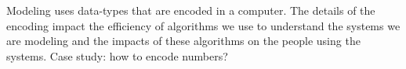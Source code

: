 
Modeling uses data-types that are encoded in a computer.
The details of the encoding impact the efficiency of algorithms
we use to understand the systems we are modeling and the 
impacts of these algorithms on the people using the systems.
Case study: how to encode numbers?

\vfill